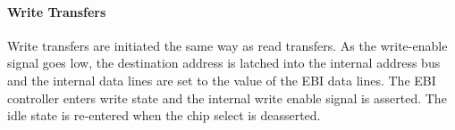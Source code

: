 \paragraph{Write Transfers}

Write transfers are initiated the same way as read transfers. As the
write-enable signal goes low, the destination address is latched into the
internal address bus and the internal data lines are set to the value of the EBI
data lines. The EBI controller enters write state and the internal write enable
signal is asserted. The idle state is re-entered when the chip select is
deasserted.
